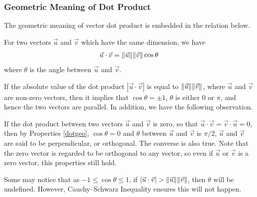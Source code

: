 \subsubsection{Geometric Meaning of Dot Product}
The geometric meaning of vector dot product is embedded in the relation below.
\begin{proper}
\label{dotgeo}
For two vectors $\vec{u}$ and $\vec{v}$ which have the same dimension, we have
\begin{align*}
\vec{u} \cdot \vec{v} = \norm{\vec{u}}\norm{\vec{v}}\cos\theta
\end{align*}
where $\theta$ is the angle between $\vec{u}$ and $\vec{v}$.
\end{proper}
\begin{center}
\end{center}
If the absolute value of the dot product $|\vec{u} \cdot \vec{v}|$ is equal to $\norm{\vec{u}}\norm{\vec{v}}$, where $\vec{u}$ and $\vec{v}$ are non-zero vectors, then it implies that $\cos\theta = \pm 1$, $\theta$ is either $0$ or $\pi$, and hence the two vectors are parallel. In addition, we have the following observation.
\begin{proper}
\label{dotorth}
If the dot product between two vectors $\vec{u}$ and $\vec{v}$ is zero, so that $\vec{u} \cdot \vec{v} = \vec{v} \cdot \vec{u} = 0$, then by Properties \ref{dotgeo}, $\cos\theta = 0$ and $\theta$ between $\vec{u}$ and $\vec{v}$ is $\pi/2$, $\vec{u}$ and $\vec{v}$ are said to be perpendicular, or orthogonal. The converse is also true. Note that the zero vector is regarded to be orthogonal to any vector, so even if $\vec{u}$ or $\vec{v}$ is a zero vector, this properties still hold.
\end{proper}
Some may notice that as $-1 \leq \cos\theta \leq 1$, if $|\vec{u} \cdot \vec{v}| > \norm{\vec{u}}\norm{\vec{v}}$, then $\theta$ will be undefined. However, Cauchy–Schwarz Inequality ensures this will not happen.
